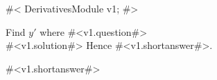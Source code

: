 



#<
DerivativesModule v1;
#>



Find $y'$ where #<v1.question#> \\



#<v1.solution#>
Hence #<v1.shortanswer#>.



#<v1.shortanswer#>



